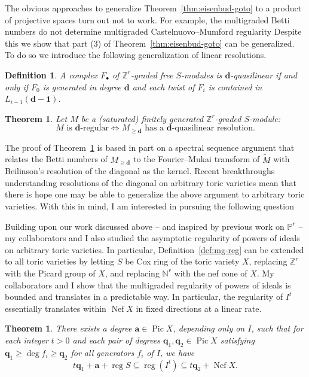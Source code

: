 \documentclass[11pt,reqno]{amsart}
\newtheorem{theorem}[lemma]{Theorem}
\newtheorem{defn}[lemma]{Definition}
\theoremstyle{remark}
\newcommand{\reg}{\operatorname{reg}}
\newcommand{\Pic}{\operatorname{Pic}}
\newcommand{\Nef}{\operatorname{Nef}}
\renewcommand{\aa}{\mathbf{a}}
\newcommand{\dd}{\mathbf{d}}
\newcommand{\one}{\mathbf{1}}
\newcommand{\qq}{\mathbf{q}}
\newcommand{\NN}{\mathbb{N}}
\newcommand{\PP}{\mathbb{P}}
\newcommand{\ZZ}{\mathbb{Z}}
\begin{document}
The obvious approaches to generalize Theorem~\ref{thm:eisenbud-goto} to a product of projective spaces turn out not to work. For example, the multigraded Betti numbers do not determine multigraded Castelnuovo--Mumford regularity \cite[Example 5.1]{bruceHellerSayrafi21} Despite this we show that part (3) of Theorem~\ref{thm:eisenbud-goto} can be generalized. To do so we introduce the following generalization of linear resolutions. 

\begin{defn}
A complex $F_{\bullet}$ of $\ZZ^{r}$-graded free $S$-modules is $\dd$-quasilinear if and only if $F_{0}$ is generated in degree $\dd$ and each twist of $F_{i}$ is contained in $L_{i-1}(\dd-\one)$.
\end{defn}

\begin{theorem}\cite[Theorem A]{bruceHellerSayrafi21}\label{thm:mgreg-main}
Let $M$ be a (saturated) finitely generated $\ZZ^{r}$-graded $S$-module:
\[
\text{$M$ is $\dd$-regular} \iff  \text{$M_{\geq\dd}$ has a $\dd$-quasilinear resolution}.
\]
\end{theorem}

The proof of Theorem~\ref{thm:mgreg-main} is based in part on a spectral sequence argument that relates the Betti numbers of $M_{\geq\dd}$ to the Fourier--Mukai transform of $\widetilde{M}$ with Beilinson's resolution of the diagonal as the kernel.  Recent breakthroughs \cite{HHL23, brownErman23-2} understanding resolutions of the diagonal on arbitrary toric varieties mean that there is hope one may be able to generalize the above argument to arbitrary toric varieties. With this in mind, I am interested in pursuing the following question

Building upon our work discussed above -- and inspired by previous work on $\PP^{r}$ \cite{BEL91,CHT99,Kodiyalam00} -- my collaborators and I also studied the asymptotic regularity of powers of ideals on arbitrary toric varieties. In particular, Definition~\ref{def:mg-reg} can be extended to all toric varieties by letting $S$ be Cox ring of the toric variety $X$, replacing $\ZZ^r$ with the Picard group of $X$, and replacing $\NN^{r}$ with the nef cone of $X$. My collaborators and I show that the multigraded regularity of powers of ideals is bounded and translates in a predictable way. In particular, the regularity of $I^{t}$ essentially translates within $\Nef X$ in fixed directions at a linear rate.
 

\begin{theorem}\cite[Theorem 4.1]{bruceHellerSayrafi22}
  There exists a degree $\aa\in\Pic X$, depending only on $I$, such that for each integer $t>0$ and each pair of degrees $\qq_1,\qq_2\in\Pic X$ satisfying $\qq_1\geq\deg f_i\geq\qq_2$ for all generators $f_i$ of $I$, we have
	\[ t\qq_1+\aa+\reg S \subseteq \reg\!\left(I^t\right) \subseteq t\qq_2+\Nef X. \]
\end{theorem}
\end{document}
